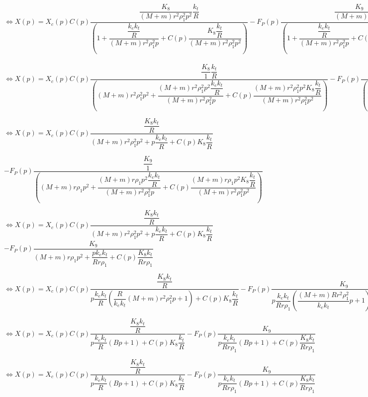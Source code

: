 $\Leftrightarrow X(p)
=
X_c(p) C(p)\dfrac{\dfrac{K_8}{\left(M+m\right)r^2\rho_1^2 p^2}  \dfrac{k_t}{R}}{\left( 1+ \dfrac{ \dfrac{k_ek_t}{R}}{\left(M+m\right)r^2\rho_1^2 p} + C(p)\dfrac{K_8 \dfrac{k_t}{R}}{\left(M+m\right)r^2\rho_1^2 p^2} \right)}
- F_P(p)\dfrac{\dfrac{K_9}{\left(M+m\right)r\rho_1 p^2}}{\left( 1+ \dfrac{ \dfrac{k_ek_t}{R}}{\left(M+m\right)r^2\rho_1^2 p} + C(p)\dfrac{K_8 \dfrac{k_t}{R}}{\left(M+m\right)r^2\rho_1^2 p^2} \right)}
$


$\Leftrightarrow X(p)
=
X_c(p) C(p)\dfrac{\dfrac{K_8}{1}  \dfrac{k_t}{R}}{\left( \left(M+m\right)r^2\rho_1^2 p^2+ \dfrac{\left(M+m\right)r^2\rho_1^2 p^2 \dfrac{k_ek_t}{R}}{\left(M+m\right)r^2\rho_1^2 p} + C(p)\dfrac{ \left(M+m\right)r^2\rho_1^2 p^2K_8 \dfrac{k_t}{R}}{\left(M+m\right)r^2\rho_1^2 p^2} \right)}
- F_P(p)\dfrac{\dfrac{K_9}{\left(M+m\right)r\rho_1 p^2}}{\left( 1+ \dfrac{ \dfrac{k_ek_t}{R}}{\left(M+m\right)r^2\rho_1^2 p} + C(p)\dfrac{K_8 \dfrac{k_t}{R}}{\left(M+m\right)r^2\rho_1^2 p^2} \right)}
$


$\Leftrightarrow X(p)
=
X_c(p) C(p)\dfrac{  \dfrac{K_8k_t}{R}}{
 \left(M+m\right)r^2\rho_1^2 p^2
 + p \dfrac{k_ek_t}{R} 
 + C(p)K_8 \dfrac{k_t}{R}
 }$
 
$- F_P(p)\dfrac{\dfrac{K_9}{1}}{\left( \left(M+m\right)r\rho_1 p^2+ \dfrac{ \left(M+m\right)r\rho_1 p^2\dfrac{k_ek_t}{R}}{\left(M+m\right)r^2\rho_1^2 p} + C(p)\dfrac{ \left(M+m\right)r\rho_1 p^2K_8 \dfrac{k_t}{R}}{\left(M+m\right)r^2\rho_1^2 p^2} \right)}
$


$\Leftrightarrow X(p)
=
X_c(p) C(p)\dfrac{  \dfrac{K_8k_t}{R}}{
 \left(M+m\right)r^2\rho_1^2 p^2
 + p \dfrac{k_ek_t}{R} 
 + C(p)K_8 \dfrac{k_t}{R}
 }
$
$- F_P(p)\dfrac{K_9}{
 \left(M+m\right)r\rho_1 p^2
 + \dfrac{  pk_ek_t}{Rr\rho_1} 
 + C(p)\dfrac{ K_8 k_t}{Rr\rho_1 } }
$


$\Leftrightarrow X(p)
=
X_c(p) C(p)\dfrac{
\dfrac{K_8k_t}{R}}{
p\dfrac{k_ek_t}{R}\left(\dfrac{R}{k_ek_t}
 \left(M+m\right)r^2\rho_1^2 p
 +  1\right) 
 + C(p)K_8 \dfrac{k_t}{R}
 }
- F_P(p)\dfrac{K_9}{
p\dfrac{  k_ek_t}{Rr\rho_1}\left(
\dfrac{\left(M+m\right) Rr^2\rho_1^2}{  k_ek_t}  p
 + 1\right)
 + C(p)\dfrac{ K_8 k_t}{Rr\rho_1 } }
$



$\Leftrightarrow X(p)
=
X_c(p) C(p)\dfrac{
\dfrac{K_8k_t}{R}}{
p\dfrac{k_ek_t}{R}\left(B p
 +  1\right) 
 + C(p)K_8 \dfrac{k_t}{R}
 }
- F_P(p)\dfrac{K_9}{
p\dfrac{  k_ek_t}{Rr\rho_1}\left(
B  p
 + 1\right)
 + C(p)\dfrac{ K_8 k_t}{Rr\rho_1 } }
$

$\Leftrightarrow X(p)
=
X_c(p) C(p)\dfrac{
\dfrac{K_8k_t}{R}}{
p\dfrac{k_ek_t}{R}\left(B p
 +  1\right) 
 + C(p)K_8 \dfrac{k_t}{R}
 }
- F_P(p)\dfrac{K_9}{
p\dfrac{  k_ek_t}{Rr\rho_1}\left(
B  p
 + 1\right)
 + C(p)\dfrac{ K_8 k_t}{Rr\rho_1 } }
$

